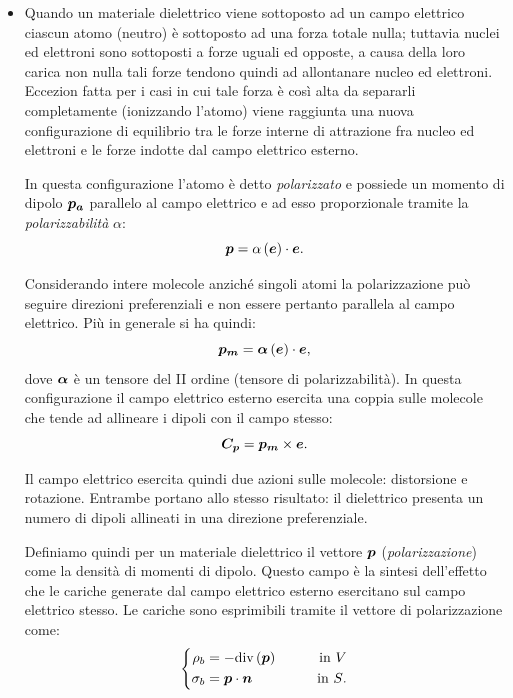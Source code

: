 \begin{itemize}
\item[\textit{Isolanti}]
Quando un materiale dielettrico viene sottoposto ad un campo elettrico ciascun atomo (neutro) è sottoposto ad una forza totale nulla; tuttavia nuclei ed elettroni sono sottoposti a forze uguali ed opposte, a causa della loro carica non nulla tali forze tendono quindi ad allontanare nucleo ed elettroni. Eccezion fatta per i casi in cui tale forza è così alta da separarli completamente (ionizzando l'atomo) viene raggiunta una nuova configurazione di equilibrio tra le forze interne di attrazione fra nucleo ed elettroni e le forze indotte dal campo elettrico esterno. 

In questa configurazione l'atomo è detto \textit{polarizzato} e possiede un momento di dipolo $\boldsymbol{p_a}$  parallelo al campo elettrico e ad esso proporzionale tramite la \textit{polarizzabilità} $\alpha$:
\begin{equation}
\label{eq:2polar1}
\boldsymbol{p} = \alpha \left(\boldsymbol{e}\right)\cdot \boldsymbol{e}.
\end{equation}

Considerando intere molecole anziché singoli atomi la polarizzazione può seguire direzioni preferenziali e non essere pertanto parallela al campo elettrico.
Più in generale si ha quindi:
\begin{equation}
\label{eq:2polar2}
\boldsymbol{p_m} = \boldsymbol{\alpha} \left( \boldsymbol{e} \right) \cdot\boldsymbol{e},
\end{equation}
dove $\boldsymbol{\alpha}$ è un tensore del II ordine (tensore di polarizzabilità).
In questa configurazione il campo elettrico esterno esercita una coppia sulle molecole che tende ad allineare i dipoli con il campo stesso:
\begin{equation}
\label{eq:2polar3}
\boldsymbol{C_p}=\boldsymbol{p_m} \times \boldsymbol{e}.
\end{equation}

Il campo elettrico esercita quindi due azioni sulle molecole: distorsione e rotazione. Entrambe portano allo stesso risultato: il dielettrico presenta un numero di dipoli allineati in una direzione preferenziale.

Definiamo quindi per un materiale dielettrico il vettore $\boldsymbol{p}$ (\textit{polarizzazione}) come la densità di momenti di dipolo. Questo campo è la sintesi dell'effetto che le cariche generate dal campo elettrico esterno esercitano sul campo elettrico stesso.
Le cariche sono esprimibili tramite il vettore di polarizzazione come:
\begin{equation}
\label{eq:2charges1}
\left\{
\begin{aligned}
\rho_{b} &= -\text{div} \left(\boldsymbol{p}\right) \qquad &\text{in $V$}\\
\sigma_{b} &= \boldsymbol{p}\cdot \boldsymbol{n} \qquad &\text{in $S$}.
\end{aligned}
\right.
\end{equation}
 

\end{itemize}
